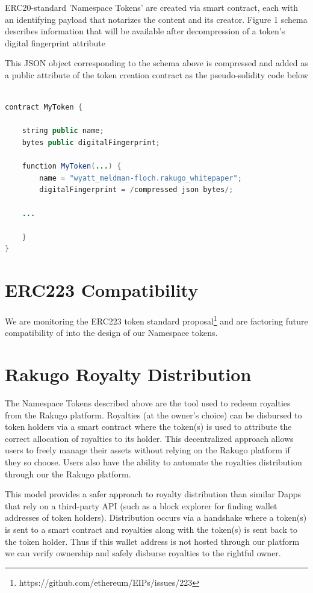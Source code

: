 \documentclass{article}
\begin{document}
ERC20-standard 'Namespace Tokens' are created via smart contract, each with an identifying payload that notarizes the content and its creator. Figure 1 schema describes information that will be available after decompression of a token’s digital fingerprint attribute

This JSON object corresponding to the schema above is compressed and added as a public attribute of the token creation contract as the pseudo-solidity code below

\begin{minipage}{\linewidth}
\begin{lstlisting}[language=java]

contract MyToken {

    string public name;
    bytes public digitalFingerprint;

    function MyToken(...) {
        name = "wyatt_meldman-floch.rakugo_whitepaper";
        digitalFingerprint = /compressed json bytes/;
        
    ...
    
    }
}
\end{lstlisting}
\end{minipage}

\section{ERC223 Compatibility}
We are monitoring the ERC223 token standard proposal\footnote{https://github.com/ethereum/EIPs/issues/223} and are factoring future compatibility of into the design of our Namespace tokens.

\section{Rakugo Royalty Distribution}

The Namespace Tokens described above are the tool used to redeem royalties from the Rakugo platform. Royalties (at the owner's choice) can be disbursed to token holders via a smart contract where the token(s) is used to attribute the correct allocation of royalties to its holder. This decentralized approach allows users to freely manage their assets without relying on the Rakugo platform if they so choose. Users also have the ability to automate the royalties distribution through our the Rakugo platform.

This model provides a safer approach to royalty distribution than similar Dapps that rely on a third-party API (such as a block explorer for finding wallet addresses of token holders). Distribution occurs via a handshake where a token(s) is sent to a smart contract and royalties along with the token(s) is sent back to the token holder. Thus if this wallet address is not hosted through our platform we can verify ownership and safely disburse royalties to the rightful owner.
\end{document}

